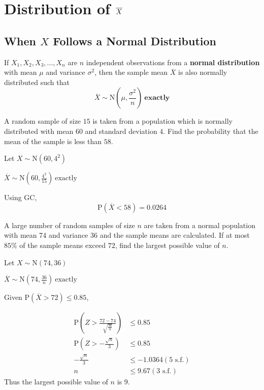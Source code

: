 \documentclass[11pt,a4paper]{book}
\begin{document}
\section{Distribution of $\textbf{\ensuremath{\overline{X}}}$ }

\subsection{When $X$ Follows a Normal Distribution}

\begin{tcolorbox}[colback=blue!5, colframe=black, boxrule=.4pt, sharpish corners]

If $X_{1},X_{2},X_{3},...,X_{n}$ are $n$ independent observations
from a \textbf{normal distribution} with mean $\mu$ and variance
$\sigma^{2}$, then the sample mean $\overline{X}$ is also normally
distributed such that
\[
\overline{X}\sim\text{N}\left(\mu,\frac{\sigma^{2}}{n}\right)\:\textbf{exactly}
\]

\end{tcolorbox}

\begin{example}

A random sample of size $15$ is taken from a population which is
normally distributed with mean $60$ and standard deviation $4$.
Find the probability that the mean of the sample is less than $58$.

\Solution

Let ${\displaystyle X\sim\text{N}\left(60,4^{2}\right)}$

${\displaystyle \overline{X}\sim\text{N}\left(60,\frac{4^{2}}{15}\right)}\:\text{exactly}$

Using GC,
\[
\text{P}\left(\overline{X}<58\right)=0.0264
\]
\end{example}

\newpage

\begin{example}

A large number of random samples of size $n$ are taken from a normal
population with mean 74 and variance 36 and the sample means are calculated.
If at most $85\%$ of the sample means exceed $72$, find the largest
possible value of $n$.

\Solution

Let ${\displaystyle X\sim\text{N}\left(74,36\right)}$

${\displaystyle \overline{X}\sim\text{N}\left(74,\frac{36}{n}\right)}\:\text{exactly}$

Given $\text{P}\left(\overline{X}>72\right)\leq0.85$,

\begin{align*}
\text{P}\left(Z>\frac{72-74}{\sqrt{\frac{36}{n}}}\right) & \leq0.85\\
\text{P}\left(Z>-\frac{\sqrt{n}}{3}\right) & \leq0.85\\
-\frac{\sqrt{n}}{3} & \leq-1.0364(\text{5 s.f.})\\
n & \leq9.67(\text{3 s.f.})
\end{align*}
Thus the largest possible value of $n$ is $9$.

\end{example}
\end{document}
